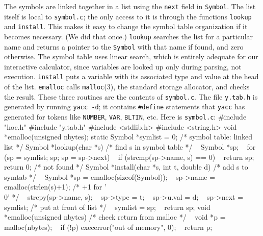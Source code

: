{The symbols are linked together in a list using the {\tt next}
field in {\tt Symbol}. The list itself is local to {\tt symbol.c};
the only access to it is through the functions {\tt lookup} and
{\tt install}. This makes it easy to change the symbol table
organization if it becomes necessary. (We did that once.)
{\tt lookup} searches the list for a particular name and returns
a pointer to the {\tt Symbol} with that name if found, and zero
otherwise. The symbol table uses linear search, which is entirely
adequate for our interactive calculator, since variables are looked
up only during parsing, not execution. {\tt install} puts a variable
with its associated type and value at the head of the list.
{\tt emalloc} calls {\tt malloc}(3), the standard storage allocator,
and checks the result. These three routines are the contents of
{\tt symbol.c}. The file {\tt y.tab.h} is generated by running
{\tt yacc -d}; it contains {\tt\#define} statements that {\tt yacc}
has generated for tokens like {\tt NUMBER}, {\tt VAR}, {\tt BLTIN},
etc. Here is {\tt symbol.c}:
\begincode
#include "hoc.h"
#include "y.tab.h"
#include <stdlib.h>
#include <string.h>
\medskip
void *emalloc(unsigned nbytes);
\medskip
static Symbol *symlist = 0;  /* symbol table: linked list */
\medskip
Symbol *lookup(char *s)  /* find s in symbol table */
{
~       Symbol *sp;
~       for (sp = symlist; sp; sp = sp->next)
~               if (strcmp(sp->name, s) == 0)
~                       return sp;
~       return 0;  /* not found */
}
\medbreak
Symbol *install(char *s, int t, double d)  /* add s to symtab */
{
~       Symbol *sp = emalloc(sizeof(Symbol));
~       sp->name = emalloc(strlen(s)+1);  /* +1 for '\\0' */
~       strcpy(sp->name, s);
~       sp->type = t;
~       sp->u.val = d;
~       sp->next = symlist;  /* put at front of list */
~       symlist = sp;
~       return sp;
}
\medbreak
void *emalloc(unsigned nbytes)  /* check return from malloc */
{
~       void *p = malloc(nbytes);
~       if (!p) execerror("out of memory", 0);
~       return p;
}
\endcode

}
